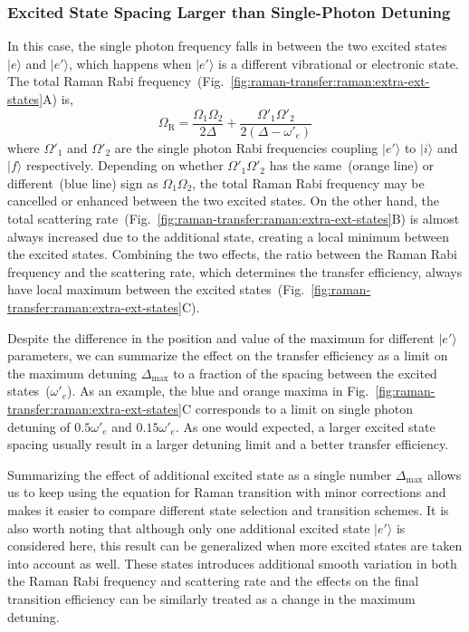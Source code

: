 \subsubsection{Excited State Spacing Larger than Single-Photon Detuning}
\label{ch:raman-transfer:raman:extra-ext:large-spacing}
In this case, the single photon frequency falls in between the two excited states
$|e\rangle$ and $|e'\rangle$,
which happens when $|e'\rangle$ is a different vibrational or electronic state.
The total Raman Rabi frequency~(Fig.~\ref{fig:raman-transfer:raman:extra-ext-states}A) is,
\[
  \Omega_{\mathrm{R}}=\frac{\Omega_1\Omega_2}{2\Delta}+\frac{\Omega'_1\Omega'_2}{2(\Delta-\omega'_e)}
\]
where $\Omega'_1$ and $\Omega'_2$ are the single photon Rabi frequencies coupling $|e'\rangle$
to $|i\rangle$ and $|f\rangle$ respectively.
Depending on whether $\Omega'_1\Omega'_2$ has the same~(orange line)
or different~(blue line) sign as $\Omega_1\Omega_2$, the total Raman Rabi frequency
may be cancelled or enhanced between the two excited states.
On the other hand,
the total scattering rate~(Fig.~\ref{fig:raman-transfer:raman:extra-ext-states}B)
is almost always increased due to the additional state, creating a local minimum
between the excited states.
Combining the two effects, the ratio between the Raman Rabi frequency and
the scattering rate, which determines the transfer efficiency, always have local maximum
between the excited states~(Fig.~\ref{fig:raman-transfer:raman:extra-ext-states}C).

Despite the difference in the position and value of the maximum for different
$|e'\rangle$ parameters, we can summarize the effect on the transfer efficiency
as a limit on the maximum detuning $\Delta_{\max}$ to a fraction of the spacing
between the excited states~($\omega'_e$).
As an example, the blue and orange maxima in
Fig.~\ref{fig:raman-transfer:raman:extra-ext-states}C
corresponds to a limit on single photon detuning of $0.5\omega'_e$ and $0.15\omega'_e$.
As one would expected, a larger excited state spacing usually result in
a larger detuning limit and a better transfer efficiency.

Summarizing the effect of additional excited state as a single number $\Delta_{\max}$ allows
us to keep using the equation for Raman transition with minor corrections
and makes it easier to compare different state selection and transition schemes.
It is also worth noting that although only one additional excited state $|e'\rangle$
is considered here, this result can be generalized when more excited states are taken into account
as well. These states introduces additional smooth variation in both the Raman Rabi frequency
and scattering rate and the effects on the final transition efficiency can be similarly
treated as a change in the maximum detuning.

